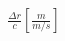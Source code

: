 \documentclass[preview]{standalone}
\begin{document}
\begin{align*}
\frac{\Delta r}{c} \left[ \frac{ m}{m/s} \right]
\end{align*}
\end{document}
